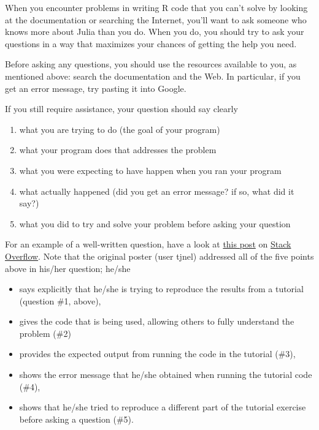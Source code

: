 \documentclass[
  11pt,
]{book}
\providecommand{\tightlist}{%
  \setlength{\itemsep}{0pt}\setlength{\parskip}{0pt}}
\begin{document}
When you encounter problems in writing R code that you can't solve by looking at the documentation or searching the Internet, you'll want to ask someone who knows more about Julia than you do. When you do, you should try to ask your questions in a way that maximizes your chances of getting the help you need.

\begin{center}

\begin{info}
Before asking any questions, you should use the resources available to you, as mentioned above: search the documentation and the Web. In particular, if you get an error message, try pasting it into Google.

\end{info}


\end{center}

If you still require assistance, your question should say clearly

\begin{enumerate}
\def\labelenumi{\arabic{enumi}.}
\tightlist
\item
  what you are trying to do (the goal of your program)
\item
  what your program does that addresses the problem
\item
  what you were expecting to have happen when you ran your program
\item
  what actually happened (did you get an error message? if so, what did it say?)
\item
  what you did to try and solve your problem before asking your question
\end{enumerate}

For an example of a well-written question, have a look at \href{http://stackoverflow.com/questions/15962111/error-using-apply-function-in-r-on-tutorial-example}{this post} on \href{http://www.stackoverflow.com}{Stack Overflow}. Note that the original poster (user tjnel) addressed all of the five points above in his/her question; he/she

\begin{itemize}
\tightlist
\item
  says explicitly that he/she is trying to reproduce the results from a tutorial (question \#1, above),
\item
  gives the code that is being used, allowing others to fully understand the problem (\#2)
\item
  provides the expected output from running the code in the tutorial (\#3),
\item
  shows the error message that he/she obtained when running the tutorial code (\#4),
\item
  shows that he/she tried to reproduce a different part of the tutorial exercise before asking a question (\#5).
\end{itemize}
\end{document}
